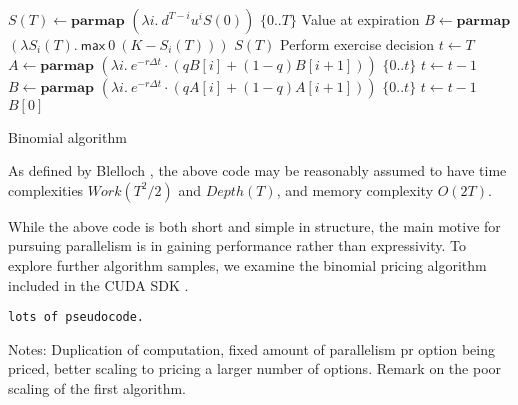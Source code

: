 \begin{algorithm}

\begin{algorithmic}
  \State $S(T) \gets \mathbf{parmap}$ $(\lambda i.\ d^{T-i}u^{i}S(0))$ $\{0..T\}$ \Comment Value at expiration
  \State $B \gets \mathbf{parmap}$ $(\lambda S_i(T).\ \mathsf{max}\ 0\ (K-S_i(T)))$ $S(T)$ \Comment Perform exercise decision
  \State $t \gets T$
    \State $A \gets \mathbf{parmap}$ $(\lambda i.\ e^{-r\Delta t} \cdot (qB[i] + (1-q)B[i+1]))$ $\{0..t\}$
    \State $t \gets t-1$
    \State $B \gets \mathbf{parmap}$ $(\lambda i.\ e^{-r\Delta t} \cdot (qA[i] + (1-q)A[i+1]))$ $\{0..t\}$
    \State $t \gets t-1$
  \EndWhile
  \State \Return $B[0]$
\EndFunction
\end{algorithmic}
  
  \caption{Binomial algorithm}
  \label{alg:binomial-algorithm}
\end{algorithm}

As defined by Blelloch \cite{blelloch1996programming}, the above code
may be reasonably assumed to have time complexities $Work(T^2/2)$ and
$Depth(T)$, and memory complexity $O(2T)$.

While the above code is both short and simple in structure, the main motive for
pursuing parallelism is in gaining performance rather than expressivity.  To
explore further algorithm samples, we examine the binomial pricing algorithm
included in the CUDA SDK \cite{CUDAbinomial}.

\begin{verbatim}
lots of pseudocode.
\end{verbatim}

Notes: Duplication of computation, fixed amount of parallelism pr option being
priced, better scaling to pricing a larger number of options. Remark on the
poor scaling of the first algorithm.

